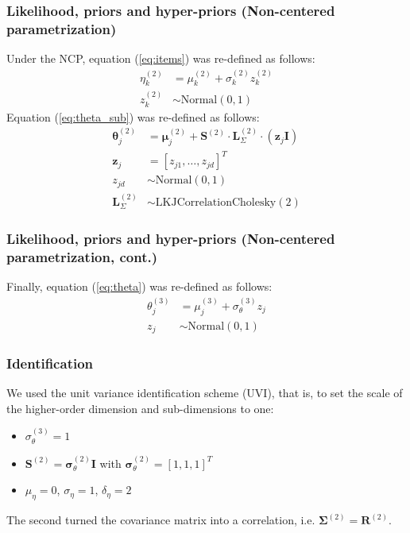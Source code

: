 \documentclass[arial,12pt,xcolor=dvipsnames]{beamer}
\begin{document}
%
\begin{frame}
	\frametitle{Likelihood, priors and hyper-priors
		(Non-centered parametrization)}
	Under the NCP, equation (\ref{eq:items}) was re-defined as follows:
	\begin{align}
		\eta^{(2)}_{k} &= \mu^{(2)}_{k} + \sigma^{(2)}_{k} z^{(2)}_{k} \\
		z^{(2)}_{k} &\sim \text{Normal}(0,1)
	\end{align}
	Equation (\ref{eq:theta_sub}) was re-defined as follows:
	\begin{align}
		\boldsymbol{\theta}^{(2)}_{j} &= \boldsymbol{\mu}^{(2)}_{j} + \boldsymbol{S}^{(2)} \cdot \boldsymbol{L}^{(2)}_{\Sigma} \cdot  (\mathbf{z}_{j} \mathbf{I}) \\
		\mathbf{z}_{j} &= [ z_{j1}, \dots, z_{jd}]^{T} \\
		z_{jd} &\sim \text{Normal}(0,1) \\
		\boldsymbol{L}^{(2)}_{\Sigma} &\sim \text{LKJCorrelationCholesky}(2)
	\end{align}
\end{frame}
%
\begin{frame}
	\frametitle{Likelihood, priors and hyper-priors
		(Non-centered parametrization, cont.)}
	Finally, equation (\ref{eq:theta}) was re-defined as follows:
	\begin{align}
		\theta^{(3)}_{j} &= \mu^{(3)}_{j} + \sigma^{(3)}_{\theta} z_{j} \\
		z_{j} &\sim \text{Normal}(0,1)
	\end{align}
\end{frame}
%
\begin{frame}
	\frametitle{Identification}
	We used the unit variance identification scheme (UVI), that is, to set the scale of the higher-order dimension and sub-dimensions to one:
	\begin{itemize}
		\item $\sigma^{(3)}_{\theta} = 1$
		\item $\mathbf{S}^{(2)} = \pmb{\sigma}^{(2)}_{\theta} \mathbf{I}$ with $\pmb{\sigma}^{(2)}_{\theta} = [1, 1, 1]^{T}$
		\item $\mu_{\eta} = 0$, $\sigma_{\eta}=1$, $\delta_{\eta}=2$
	\end{itemize}
	The second turned the covariance matrix into a correlation, i.e. $\boldsymbol{\Sigma}^{(2)} = \boldsymbol{R}^{(2)}$.
\end{frame}
\end{document}
